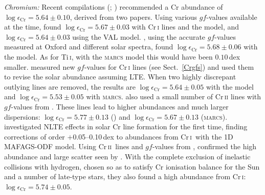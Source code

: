 \documentclass[traditabstract]{aa}
\newcommand{\altcri}{Cr\,\textsc{i}}
\newcommand{\altcrii}{Cr\,\textsc{ii}}
\newcommand{\cri}{\altcri\ }
\newcommand{\crii}{\altcrii\ }
\begin{document}
\textit{Chromium:} Recent compilations (; \citealt{Grevesse07})
recommended a Cr abundance of $\log
\epsilon_\mathrm{Cr}=5.64\pm0.10$, derived from two papers.  Using
various $gf$-values available at the time, \citet{Biemont78c} found
$\log \epsilon_\mathrm{Cr}=5.67\pm0.03$ with Cr\,\textsc{i} lines
and the  model, and $\log
\epsilon_\mathrm{Cr}=5.64\pm0.03$ using the VAL \citep{VAL76} model.
\citet{Blackwell87}, using the accurate $gf$-values measured at
Oxford and different solar spectra, found $\log
\epsilon_\mathrm{Cr}=5.68\pm0.06$ with the  model. As
for Ti\,\textsc{i}, with the \textsc{marcs} model this
would have been $0.10$\,dex smaller.  \citet{Sobeck07}
measured new $gf$-values for Cr\,\textsc{i} lines (see
Sect.~\ref{Crgfs}) and used them to revise the solar abundance assuming LTE. When
two highly discrepant outlying lines are removed,
the results are $\log \epsilon_\mathrm{Cr}=5.64\pm0.05$ with the
 model and $\log
\epsilon_\mathrm{Cr}=5.53\pm0.05$ with \textsc{marcs}.
\citeauthor{Sobeck07} also used a small number of Cr\,\textsc{ii}
lines with $gf$-values from \citet{Nilsson06}. These lines lead to
higher abundances and much larger dispersions: $\log
\epsilon_\mathrm{Cr}=5.77\pm0.13$ () and $\log
\epsilon_\mathrm{Cr}=5.67\pm0.13$ (\textsc{marcs}).  \citet{Bergemann10} investigated
NLTE effects in solar Cr line formation for the first time, finding corrections of order $+$0.05--0.10\,dex
to abundances from \cri with the 1D MAFAGS-ODF model.  Using \crii lines and 
$gf$-values from \citet{Nilsson06}, \citeauthor{Bergemann10} confirmed the high abundance 
and large scatter seen by \citet{Sobeck07}.  With the complete exclusion of inelastic collisions
with hydrogen, chosen so as to satisfy Cr ionisation balance for the Sun and a number of late-type stars, they also found 
a high abundance from \altcri: $\log \epsilon_\mathrm{Cr}=5.74\pm0.05$.
\end{document}
